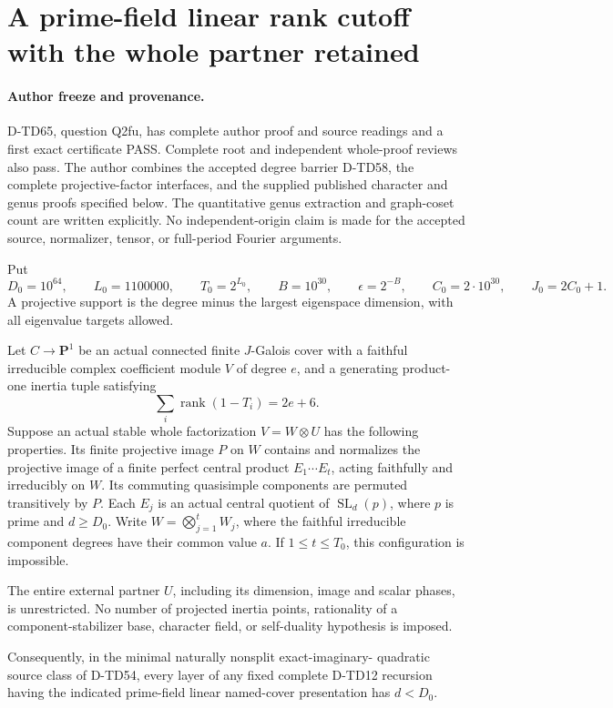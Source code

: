 \section{A prime-field linear rank cutoff with the whole partner retained}
\label{sec:prime-field-linear-point-cutoff}

\paragraph{Author freeze and provenance.}
D-TD65, question Q2fu, has complete author proof and source
readings and a first exact certificate PASS. Complete root and
independent whole-proof reviews also pass.
The author combines the accepted degree barrier
D-TD58, the complete projective-factor interfaces, and the supplied
published character and genus proofs specified below. The quantitative
genus extraction and graph-coset count are written explicitly.
No independent-origin claim is made for the accepted source,
normalizer, tensor, or full-period Fourier arguments.

Put
\[
 D_0=10^{64},\qquad L_0=1100000,\qquad T_0=2^{L_0},
 \qquad B=10^{30},\qquad \epsilon=2^{-B},
 \qquad C_0=2\cdot10^{30},\qquad J_0=2C_0+1.
 \tag{PFL.1}
\]
A projective support is the degree minus the largest eigenspace
dimension, with all eigenvalue targets allowed.

\begin{theorem}[D-TD65]
Let \(C\to\mathbf P^1\) be an actual connected finite \(J\)-Galois
cover with a faithful irreducible complex coefficient module \(V\)
of degree \(e\), and a generating product-one inertia tuple satisfying
\[
                    \sum_i\operatorname{rank}(1-T_i)=2e+6.
 \tag{PFL.2}
\]
Suppose an actual stable whole factorization
\(V=W\otimes U\) has the following properties. Its finite projective
image \(P\) on \(W\) contains and normalizes the projective image of
a finite perfect central product \(E_1\cdots E_t\), acting faithfully
and irreducibly on \(W\). Its commuting quasisimple components are
permuted transitively by \(P\). Each \(E_j\) is an actual central
quotient of \(\operatorname{SL}_d(p)\), where \(p\) is prime and
\(d\ge D_0\). Write \(W=\bigotimes_{j=1}^t W_j\), where the faithful
irreducible component degrees have their common value \(a\).
If \(1\le t\le T_0\), this configuration is impossible.

The entire external partner \(U\), including its dimension, image
and scalar phases, is unrestricted. No number of projected inertia
points, rationality of a component-stabilizer base, character field,
or self-duality hypothesis is imposed.

Consequently, in the minimal naturally nonsplit exact-imaginary-
quadratic source class of D-TD54, every layer of any fixed complete
D-TD12 recursion having the indicated prime-field linear
named-cover presentation has \(d<D_0\).
\end{theorem}

